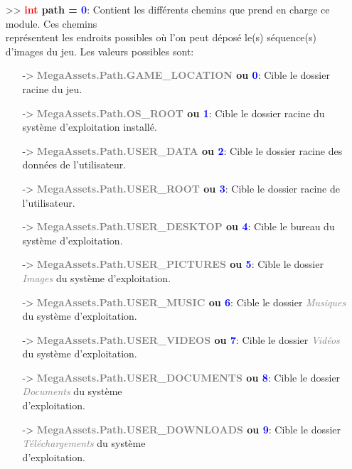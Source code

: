 \documentclass[a4paper, 11pt]{article}
\begin{document}
	\begin{itemize}
		\item[>> \textbf{\textcolor{red}{int} path = \textcolor{blue}{0}}:] Contient les différents chemins 
		que prend en charge ce module. Ces chemins \\représentent les endroits possibles où l'on peut déposé 
		le(s) séquence(s) d'images du jeu. Les valeurs possibles sont:
		\begin{itemize}
			\item[-> \textbf{\textcolor{gray}{MegaAssets.Path.GAME\_LOCATION} ou \textcolor{blue}{0}}:] 
			Cible le dossier racine du jeu.
			\item[-> \textbf{\textcolor{gray}{MegaAssets.Path.OS\_ROOT} ou \textcolor{blue}{1}}:] Cible le 
			dossier racine du système d'exploitation installé.
			\item[-> \textbf{\textcolor{gray}{MegaAssets.Path.USER\_DATA} ou \textcolor{blue}{2}}:] Cible le 
			dossier racine des données de l'utilisateur.
			\item[-> \textbf{\textcolor{gray}{MegaAssets.Path.USER\_ROOT} ou \textcolor{blue}{3}}:] Cible le 
			dossier racine de l'utilisateur.
			\item[-> \textbf{\textcolor{gray}{MegaAssets.Path.USER\_DESKTOP} ou \textcolor{blue}{4}}:] Cible 
			le bureau du système d'exploitation.
			\item[-> \textbf{\textcolor{gray}{MegaAssets.Path.USER\_PICTURES} ou \textcolor{blue}{5}}:] 
			Cible le dossier \textcolor{gray}{\textit{Images}} du système d'exploitation.
			\item[-> \textbf{\textcolor{gray}{MegaAssets.Path.USER\_MUSIC} ou \textcolor{blue}{6}}:] Cible 
			le dossier \textcolor{gray}{\textit{Musiques}} du système d'exploitation.
			\item[-> \textbf{\textcolor{gray}{MegaAssets.Path.USER\_VIDEOS} ou \textcolor{blue}{7}}:] Cible 
			le dossier \textcolor{gray}{\textit{Vidéos}} du système d'exploitation.
			\item[-> \textbf{\textcolor{gray}{MegaAssets.Path.USER\_DOCUMENTS} ou \textcolor{blue}{8}}:] 
			Cible le dossier \textcolor{gray}{\textit{Documents}} du système \\d'exploitation.
			\item[-> \textbf{\textcolor{gray}{MegaAssets.Path.USER\_DOWNLOADS} ou \textcolor{blue}{9}}:] 
			Cible le dossier \textcolor{gray}{\textit{Téléchargements}} du système \\d'exploitation.\\

\end{itemize}
\end{itemize}
\end{document}
